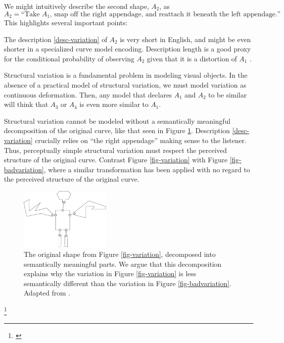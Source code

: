 We might intuitively describe the second shape, $A_2$, as
$$ A_2 =\mbox{``Take $A_1$, snap off the right appendage, and reattach
  it beneath the left appendage.''}. \label{desc-variation}$$ 
This highlights several important points:

The description \ref{desc-variation} of $A_2$ is very short in
English, and might be even shorter in a specialized curve model
encoding. Description length is a good proxy for the conditional
probability of observing $A_2$ given that it is a distortion of $A_1$
\cite{potter-geman-bienenstock}.

Structural variation is a fundamental problem in modeling visual
objects. In the absence of a practical model of structural variation,
we must model variation as continuous deformation. Then, any model
that declares $A_1$ and $A_2$ to be similar will think that $A_3$ or
$A_4$ is even more similar to $A_1$.

Structural variation cannot be modeled without a semantically
meaningful decomposition of the original curve, like that seen in
Figure \ref{fig-variation-decompose}. Description \ref{desc-variation}
crucially relies on ``the right appendage'' making sense to the
listener. Thus, perceptually simple structural variation must respect
the perceived structure of the original curve. Contrast Figure
\ref{fig-variation} with Figure \ref{fig-badvariation}, where a
similar transformation has been applied with no regard to the
perceived structure of the original curve.

\begin{figure}[h]
\centering
\includegraphics[height=30mm]{images/basri_decomposed.png} 
\caption{The original shape from Figure \ref{fig-variation},
  decomposed into semantically meaningful parts. We argue that this
  decomposition explains why the variation in Figure
  \ref{fig-variation} is less semantically different than the
  variation in Figure \ref{fig-badvariation}. Adapted from
.}
\label{fig-variation-decompose}
\end{figure}
\footnote{\cite{basri-jacobs}}

